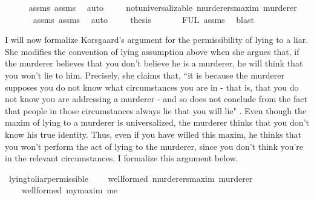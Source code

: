 \begin{isabellebody}
\ \ \ \ \isamarkupfalse%
\ assms{\isacharparenleft}{}{\isacharparenright}\ assms{\isacharparenleft}{}{\isacharparenright}\ \isamarkupfalse%
\ auto\isanewline
\ \ \ \isamarkupfalse%
\ {\isachardoublequoteopen}not{\isacharunderscore}universalizable\ murderers{\isacharunderscore}maxim\ murderer{\isachardoublequoteclose}\isanewline
\ \ \ \ \ \isamarkupfalse%
\ assms{\isacharparenleft}{}{\isacharparenright}\ assms{\isacharparenleft}{}{\isacharparenright}\ \isamarkupfalse%
\ auto\isanewline
\ \ \ \isamarkupfalse%
\ {\isacharquery}thesis\isanewline
\ \ \ \ \ \isamarkupfalse%
\ FUL\ assms{\isacharparenleft}{}{\isacharparenright}\ \isamarkupfalse%
\ blast\isanewline
\ \isamarkupfalse%
%
\endisatagproof
{\isafoldproof}%
%
\isadelimproof
%
\endisadelimproof
%
\begin{isamarkuptext}%
I will now formalize Korsgaard's argument for the permissibility of lying to a liar. She modifies
the convention of lying assumption above when she argues that, if the murderer believes that you don't 
believe he is a murderer, he will think that you won't lie to him. Precisely, she claims that, 
``it is because the murderer supposes you do not know what circumstances you are in - that is, that 
you do not know you are addressing a murderer - and so does not conclude from the fact that people 
in those circumstances always lie that you will lie" \cite[6]{KorsgaardRTL}. Even though the maxim of 
lying to a murderer is universalized, the murderer thinks that you don't know his true identity. Thus,
even if you have willed this maxim, he thinks that you won't perform the act of lying to the murderer,
since you don't think you're in the relevant circumstances. I formalize this argument below.%
\end{isamarkuptext}\isamarkuptrue%
\isamarkupfalse%
\ lying{\isacharunderscore}to{\isacharunderscore}liar{\isacharunderscore}permissible{\isacharcolon}\isanewline
\ \ \ {\isachardoublequoteopen}{\isasymTurnstile}\ {\isacharparenleft}well{\isacharunderscore}formed\ murderers{\isacharunderscore}maxim\ murderer{\isacharparenright}{\isachardoublequoteclose}\isanewline
\ \ \ {\isachardoublequoteopen}{\isasymTurnstile}\ {\isacharparenleft}well{\isacharunderscore}formed\ my{\isacharunderscore}maxim\ me{\isacharparenright}{\isachardoublequoteclose}\isanewline
%
\end{isabellebody}
